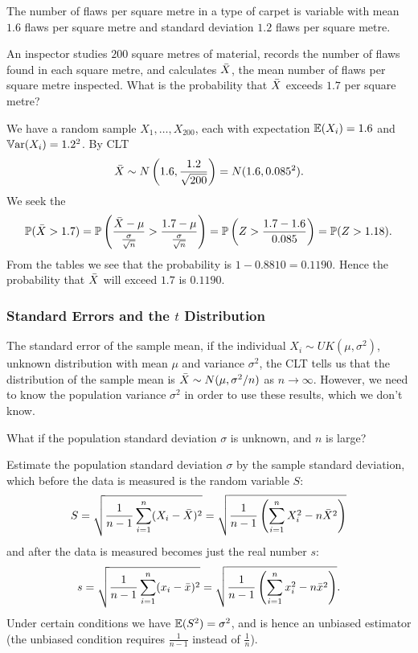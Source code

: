 \documentclass[10pt, a4paper]{article}
\begin{document}
\begin{example}
    The number of flaws per square metre in a type of carpet is variable with mean $1.6$ flaws per square metre and standard deviation $1.2$ flaws per square metre.

    An inspector studies $200$ square metres of material,
    records the number of flaws found in each square metre,
    and calculates $\Bar{X}$,
    the mean number of flaws per square metre inspected.
    What is the probability that $\Bar{X}$ exceeds $1.7$ per square metre?

    \begin{solution}
        We have a random sample $X_1, \dotsc, X_{200}$,
        each with expectation $\E(X_i) = 1.6$ and $\Var(X_i) = 1.2 ^ 2$.
        By CLT
        \[
        \Bar{X} \sim N\left(1.6, \frac{1.2}{\sqrt{200}}\right) = N(1.6, 0.085 ^ 2).
        \]
        We seek the
        \[
        \P(\Bar{X} > 1.7) = \P\left(\frac{\Bar{X} - \mu}{\frac{\sigma}{\sqrt{n}}} > \frac{1.7 - \mu}{\frac{\sigma}{\sqrt{n}}}\right) = \P\left(Z > \frac{1.7 - 1.6}{0.085}\right) = \P(Z > 1.18).
        \]
        From the tables we see that the probability is $1 - 0.8810 = 0.1190$.
        Hence the probability that $\Bar{X}$ will exceed $1.7$ is $0.1190$.
    \end{solution}
\end{example}

\subsubsection{Standard Errors and the \texorpdfstring{$t$}{} Distribution}

The standard error of the sample mean,
if the individual $X_i \sim UK(\mu, \sigma ^ 2)$,
unknown distribution with mean $\mu$ and variance $\sigma ^ 2$,
the CLT tells us that the distribution of the sample mean is $\Bar{X} \sim N(\mu, \sigma ^ 2 / n)$ as $n \rightarrow \infty$.
However,
we need to know the population variance $\sigma ^ 2$ in order to use these results,
which we don't know.

What if the population standard deviation $\sigma$ is unknown,
and $n$ is large?

Estimate the population standard deviation $\sigma$ by the sample standard deviation,
which before the data is measured is the random variable $S$:
\[
S = \sqrt{\frac{1}{n - 1}\sum_{i = 1}^{n}(X_i - \Bar{X}) ^ 2} = \sqrt{\frac{1}{n - 1}\left(\sum_{i = 1}^{n}X_i ^ 2 - n\Bar{X} ^ 2\right)}
\]
and after the data is measured becomes just the real number $s$:
\[
s = \sqrt{\frac{1}{n - 1}\sum_{i = 1}^{n}(x_i - \Bar{x}) ^ 2} = \sqrt{\frac{1}{n - 1}\left(\sum_{i = 1}^{n}x_i ^ 2 - n\Bar{x} ^ 2\right)}.
\]
Under certain conditions we have $\E(S ^ 2) = \sigma ^ 2$,
and is hence an unbiased estimator
(the unbiased condition requires $\frac{1}{n - 1}$ instead of $\frac{1}{n}$).
\end{document}
